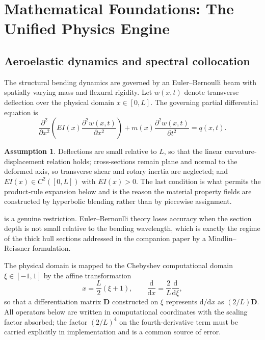 \documentclass[11pt,a4paper]{article}
\theoremstyle{definition}
\newtheorem{assumption}[theorem]{Assumption}
\numberwithin{equation}{section}
\newcommand{\diff}{\mathrm{d}}
\begin{document}
\section{Mathematical Foundations: The Unified Physics Engine}
\label{sec:physics}

\subsection{Aeroelastic dynamics and spectral collocation}
\label{sec:aeroelastic}

The structural bending dynamics are governed by an Euler--Bernoulli beam with spatially varying mass and flexural rigidity. Let $w(x,t)$ denote transverse deflection over the physical domain $x \in [0, L]$. The governing partial differential equation is
\begin{equation}
\label{eq:beam}
\frac{\partial^2}{\partial x^2} \left( EI(x) \frac{\partial^2 w(x,t)}{\partial x^2} \right) + m(x) \frac{\partial^2 w(x,t)}{\partial t^2} = q(x,t).
\end{equation}

\begin{assumption}
\label{as:beam}
Deflections are small relative to $L$, so that the linear curvature-displacement relation holds; cross-sections remain plane and normal to the deformed axis, so transverse shear and rotary inertia are neglected; and $EI(x) \in C^2([0,L])$ with $EI(x) > 0$. The last condition is what permits the product-rule expansion below and is the reason the material property fields are constructed by hyperbolic blending rather than by piecewise assignment.
\end{assumption}

 is a genuine restriction. Euler--Bernoulli theory loses accuracy when the section depth is not small relative to the bending wavelength, which is exactly the regime of the thick hull sections addressed in the companion paper by a Mindlin--Reissner formulation.

The physical domain is mapped to the Chebyshev computational domain $\xi \in [-1,1]$ by the affine transformation
\begin{equation}
\label{eq:map}
x = \frac{L}{2}(\xi + 1), \qquad \frac{\diff}{\diff x} = \frac{2}{L}\frac{\diff}{\diff \xi},
\end{equation}
so that a differentiation matrix $\mathbf{D}$ constructed on $\xi$ represents $\diff/\diff x$ as $(2/L)\mathbf{D}$. All operators below are written in computational coordinates with the scaling factor absorbed; the factor $(2/L)^4$ on the fourth-derivative term must be carried explicitly in implementation and is a common source of error.
\end{document}
